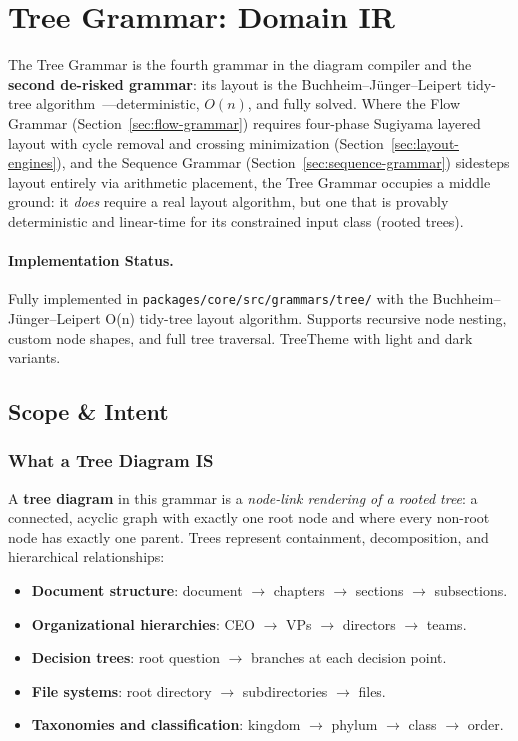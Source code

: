 \section{Tree Grammar: Domain IR}
\label{sec:tree-grammar}

The Tree Grammar is the fourth grammar in the diagram compiler and the \textbf{second de-risked grammar}: its layout is the Buchheim--J{\"u}nger--Leipert tidy-tree algorithm~\cite{buchheim2002}---deterministic, $O(n)$, and fully solved. Where the Flow Grammar (Section~\ref{sec:flow-grammar}) requires four-phase Sugiyama layered layout with cycle removal and crossing minimization (Section~\ref{sec:layout-engines}), and the Sequence Grammar (Section~\ref{sec:sequence-grammar}) sidesteps layout entirely via arithmetic placement, the Tree Grammar occupies a middle ground: it \emph{does} require a real layout algorithm, but one that is provably deterministic and linear-time for its constrained input class (rooted trees).

\paragraph{Implementation Status.}
Fully implemented in \texttt{packages/core/src/grammars/tree/} with the Buchheim--J{\"u}nger--Leipert O(n) tidy-tree layout algorithm. Supports recursive node nesting, custom node shapes, and full tree traversal. TreeTheme with light and dark variants.

\subsection{Scope \& Intent}
\label{sec:tree-scope}

\subsubsection{What a Tree Diagram IS}

A \textbf{tree diagram} in this grammar is a \emph{node-link rendering of a rooted tree}: a connected, acyclic graph with exactly one root node and where every non-root node has exactly one parent. Trees represent containment, decomposition, and hierarchical relationships:

\begin{itemize}
  \item \textbf{Document structure}: document $\rightarrow$ chapters $\rightarrow$ sections $\rightarrow$ subsections.
  \item \textbf{Organizational hierarchies}: CEO $\rightarrow$ VPs $\rightarrow$ directors $\rightarrow$ teams.
  \item \textbf{Decision trees}: root question $\rightarrow$ branches at each decision point.
  \item \textbf{File systems}: root directory $\rightarrow$ subdirectories $\rightarrow$ files.
  \item \textbf{Taxonomies and classification}: kingdom $\rightarrow$ phylum $\rightarrow$ class $\rightarrow$ order.
\end{itemize}

